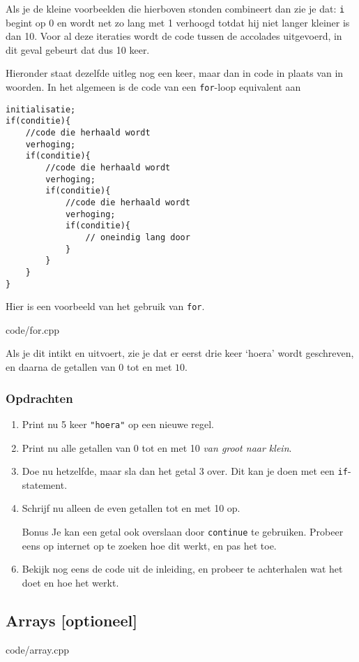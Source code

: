 \documentclass[12pt,a4paper]{article}
\newcommand{\code}{}
\newcommand{\icode}{\lstinline}
\begin{document}
Als je de kleine voorbeelden die hierboven stonden combineert dan zie je dat: \icode{i} begint op 0 en wordt net zo lang met 1 verhoogd totdat hij niet langer kleiner is dan 10. Voor al deze iteraties wordt de code tussen de accolades uitgevoerd, in dit geval gebeurt dat dus 10 keer. 

Hieronder staat dezelfde uitleg nog een keer, maar dan in code in plaats van in woorden. In het algemeen is de code van een \icode{for}-loop equivalent aan
\begin{lstlisting}
initialisatie;
if(conditie){
	//code die herhaald wordt
	verhoging;
	if(conditie){
		//code die herhaald wordt
		verhoging;
		if(conditie){
			//code die herhaald wordt
			verhoging;
			if(conditie){
				// oneindig lang door
			}
		}
	}
}
\end{lstlisting}
Hier is een voorbeeld van het gebruik van \icode{for}.

\code{code/for.cpp}

Als je dit intikt en uitvoert, zie je dat er eerst drie keer `hoera' wordt geschreven, en daarna de getallen van $0$ tot en met $10$.

\subsubsection{Opdrachten}
\begin{enumerate}
	\item
		Print nu 5 keer \icode{"hoera"} op een nieuwe regel.
    \item 
        Print nu alle getallen van 0 tot en met 10 \textit{van groot naar klein}.
	\item
		Doe nu hetzelfde, maar sla dan het getal 3 over. Dit kan je doen met een \icode{if}-statement.
	\item
		Schrijf nu alleen de even getallen tot en met 10 op.
	\item[Bonus] 
		Je kan een getal ook overslaan door \icode{continue} te gebruiken.
		Probeer eens op internet op te zoeken hoe dit werkt, en pas het toe.
	\item
		Bekijk nog eens de code uit de inleiding, en probeer te achterhalen wat het doet en hoe het werkt.
\end{enumerate}

\clearpage
\subsection{Arrays [optioneel]}

\code{code/array.cpp}
\end{document}
